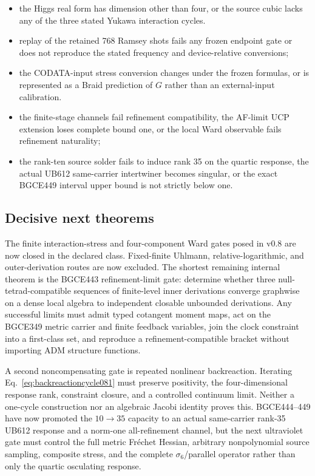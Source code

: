\documentclass[11pt]{article}
\theoremstyle{definition}
\theoremstyle{remark}
\begin{document}
\begin{itemize}
\item the Higgs real form has dimension other than four, or the source cubic lacks any of the three stated Yukawa interaction cycles.
\item replay of the retained 768 Ramsey shots fails any frozen endpoint gate or does not reproduce the stated frequency and device-relative conversions;
\item the CODATA-input stress conversion changes under the frozen formulas, or is represented as a Braid prediction of $G$ rather than an external-input calibration.
\item the finite-stage channels fail refinement compatibility, the AF-limit UCP extension loses complete bound one, or the local Ward observable fails refinement naturality;
\item the rank-ten source solder fails to induce rank 35 on the quartic response, the actual UB612 same-carrier intertwiner becomes singular, or the exact BGCE449 interval upper bound is not strictly below one.
\end{itemize}

\subsection{Decisive next theorems}

The finite interaction-stress and four-component Ward gates posed in v0.8 are now closed in the declared class. Fixed-finite Uhlmann, relative-logarithmic, and outer-derivation routes are now excluded. The shortest remaining internal theorem is the BGCE443 refinement-limit gate: determine whether three null-tetrad-compatible sequences of finite-level inner derivations converge graphwise on a dense local algebra to independent closable unbounded derivations. Any successful limits must admit typed cotangent moment maps, act on the BGCE349 metric carrier and finite feedback variables, join the clock constraint into a first-class set, and reproduce a refinement-compatible bracket without importing ADM structure functions.

A second noncompensating gate is repeated nonlinear backreaction. Iterating Eq.~\eqref{eq:backreactioncycle081} must preserve positivity, the four-dimensional response rank, constraint closure, and a controlled continuum limit. Neither a one-cycle construction nor an algebraic Jacobi identity proves this. BGCE444--449 have now promoted the $10\to35$ capacity to an actual same-carrier rank-35 UB612 response and a norm-one all-refinement channel, but the next ultraviolet gate must control the full metric Fr\'echet Hessian, arbitrary nonpolynomial source sampling, composite stress, and the complete $\sigma_6$/parallel operator rather than only the quartic osculating response.
\end{document}
